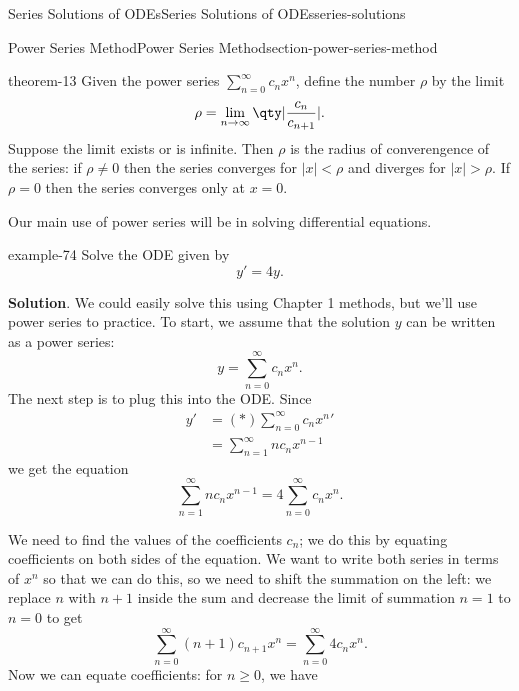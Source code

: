 \documentclass[oneside,10pt,]{book}
\numberwithin{equation}{section}
\newcommand{\limit}[2]{\lim_{#1\to#2}}
\newcommand{\parens}[1]{\left( #1 \right)}
\newcommand{\lt}{<}
\newcommand{\gt}{>}
\newcommand{\amp}{&}
\begin{document}
\begin{chapterptx}{Series Solutions of ODEs}{}{Series Solutions of ODEs}{}{}{series-solutions}
\begin{sectionptx}{Power Series Method}{}{Power Series Method}{}{}{section-power-series-method}
\begin{theorem}{}{}{theorem-13}
\hypertarget{p-440}{}%
Given the power series \(\sum_{n=0}^{\infty}c_{n}x^{n}\), define the number \(\rho\) by the limit%
\begin{equation*}
\rho = \limit{n}{\infty}\qty|\frac{c_{n}}{c_{n+1}}|.
\end{equation*}
Suppose the limit exists or is infinite. Then \(\rho\) is the radius of converengence of the series: if \(\rho\neq0\) then the series converges for \(|x|\lt\rho\) and diverges for \(|x|\gt\rho\). If \(\rho=0\) then the series converges only at \(x=0\).%
\end{theorem}
\hypertarget{p-441}{}%
Our main use of power series will be in solving differential equations.%
\begin{example}{}{example-74}%
\hypertarget{p-442}{}%
Solve the ODE given by%
\begin{equation*}
y' = 4y.
\end{equation*}
%
\par\smallskip%
\noindent\textbf{Solution}.\hypertarget{solution-71}{}\quad%
\hypertarget{p-443}{}%
We could easily solve this using Chapter 1 methods, but we'll use power series to practice. To start, we assume that the solution \(y\) can be written as a power series:%
\begin{equation*}
y = \sum_{n=0}^{\infty}c_{n}x^{n}.
\end{equation*}
The next step is to plug this into the ODE. Since%
\begin{align*}
y' \amp= \parens*{\sum_{n=0}^{\infty}c_{n}x^{n}}'\\
\amp= \sum_{n=1}^{\infty}nc_{n}x^{n-1}
\end{align*}
we get the equation%
\begin{equation*}
\sum_{n=1}^{\infty}nc_{n}x^{n-1} = 4\sum_{n=0}^{\infty}c_{n}x^{n}\text{.}
\end{equation*}
%
\par
\hypertarget{p-444}{}%
We need to find the values of the coefficients \(c_{n}\); we do this by equating coefficients on both sides of the equation. We want to write both series in terms of \(x^{n}\) so that we can do this, so we need to shift the summation on the left: we replace \(n\) with \(n+1\) inside the sum and decrease the limit of summation \(n=1\) to \(n=0\) to get%
\begin{equation*}
\sum_{n=0}^{\infty}(n+1)c_{n+1}x^{n} = \sum_{n=0}^{\infty}4c_{n}x^{n}\text{.}
\end{equation*}
Now we can equate coefficients: for \(n\geq0\), we have%
\begin{equation*}

\end{equation*}
\end{example}
\end{sectionptx}
\end{chapterptx}
\end{document}
